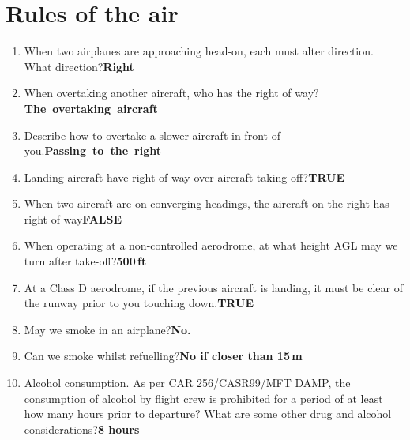 \documentclass[11pt]{article}
\begin{document}
\section{Rules of the air}
\begin{enumerate}
	\item When two airplanes are approaching head-on, each must alter direction. What direction?\hfill\textbf{Right}
	\item When overtaking another aircraft, who has the right of way?\hfill\mbox{\textbf{The overtaking aircraft}}
	\item Describe how to overtake a slower aircraft in front of you.\hfill\mbox{\textbf{Passing to the right}}
	\item Landing aircraft have right-of-way over aircraft taking off?\hfill\textbf{TRUE}
	\item When two aircraft are on converging headings, the aircraft on the right has right of way\hfill\textbf{FALSE}
	\item When operating at a non-controlled aerodrome, at what height AGL may we turn after take-off?\vfill\textbf{500\,ft}
	\item At a Class D aerodrome, if the previous aircraft is landing, it must be clear of the runway prior to you touching down.\hfill\textbf{TRUE}
	\item May we smoke in an airplane?\hfill\textbf{No.}
	\item Can we smoke whilst refuelling?\hfill\textbf{No if closer than 15\,m}
	\item Alcohol consumption. As per CAR 256/CASR99/MFT DAMP, the consumption of alcohol by flight crew is 
	prohibited for a period of at least how many hours prior to departure? What are some other drug and
	alcohol considerations?\hfill\textbf{8 hours}

\end{enumerate}
\end{document}
